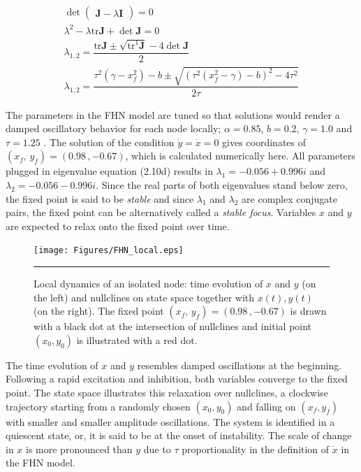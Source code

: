 \begin{subequations}
\begin{align} \det \begin{pmatrix} \textbf{J} - \lambda \textbf{I} \end{pmatrix} = 0
              \label{eqn: frobenius 8}\\  
 \lambda^2 - \lambda \mathrm{tr} \textbf{J} + \det \textbf{J} = 0
               \label{eqn: frobenius 9} \\
\lambda_{1,2} = \dfrac{\mathrm{tr} \textbf{J} \pm \sqrt{\mathrm{tr} ^1 \textbf{J}} -4 \det \textbf{J} }{2}               
                \label{eqn: frobenius 10} \\    
\lambda_{1,2} = \dfrac{\tau^2(\gamma - x_f^2)-b \pm \sqrt{(\tau^2(x_f^2-\gamma)-b)^2 - 4 \tau^2 }}{2 \tau}
               \label{eqn: frobenius 11}                 
               \end{align} 
\end{subequations}

The parameters in the FHN model are tuned so that solutions would render a damped oscillatory behavior for each node locally;  $\alpha = 0.85$, $b=0.2$, $\gamma=1.0$ and $\tau=1.25$ \citep{VUK13}. The solution of the condition $\dot{y}=\dot{x}=0$ gives coordinates of $(x_f, \, y_f) = (0.98 \, , -0.67 )$, which is calculated numerically here. All parameters plugged in eigenvalue equation (2.10d) results in $\lambda_1 = -0.056 + 0.996 i$ and $\lambda_2 = -0.056 - 0.996 i$. Since the real parts of both eigenvalues stand below zero, the fixed point is said to be \textit{stable} and since $\lambda_1$ and $\lambda_2$ are complex conjugate pairs, the fixed point can be alternatively called a \textit{stable focus}. Variables $x$ and $y$ are expected to relax onto the fixed point over time.  

\begin{figure}[htbp]
  \centering
	\texttt{[image: Figures/FHN\_local.eps]}
 
    \rule{35em}{0.5pt}
    \caption[FHN Local]{Local dynamics of an isolated node: time evolution of $x$ and  $y$ (on the left) and nullclines on state space together with $x(t),y(t)$ (on the right). The fixed point $(x_f, \, y_f) = (0.98 \, , -0.67 )$ is drawn with a black dot at the intersection of nullclines and initial point $(x_0, y_0)$ is illustrated with a red dot.  }
  \label{fig:FHN Local}	
\end{figure}

The time evolution of $x$ and $y$ resembles damped oscillations at the beginning. Following a rapid excitation and inhibition, both variables converge to the fixed point. The state space illustrates this relaxation over nullclines, a clockwise trajectory starting from a randomly chosen $(x_0, y_0)$ and falling on $(x_f, y_f)$ with smaller and smaller amplitude oscillations. The system is identified in a  quiescent state, or, it is said to be at the onset of instability. The scale of change in $x$  is more pronounced than $y$ due to $\tau$ proportionality in the definition of $\dot{x}$ in the FHN model.  
 
